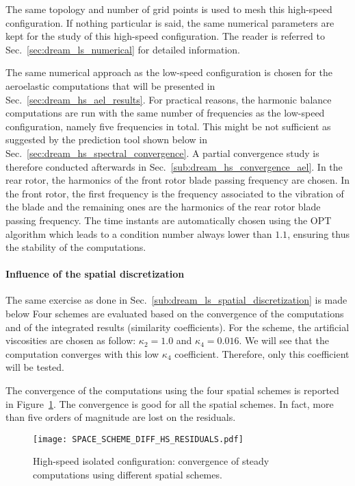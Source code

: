 
The same topology and number of grid points is used to
mesh this high-speed configuration. 
If nothing particular is said, the same numerical parameters
are kept for the study of this
high-speed configuration.
The reader is referred to 
Sec.~\ref{sec:dream_ls_numerical} for detailed information.

The same numerical approach as the low-speed configuration
is chosen for the aeroelastic computations that will
be presented in
Sec.~\ref{sec:dream_hs_ael_results}.
For practical reasons, the harmonic balance computations are run with
the same number of frequencies as the low-speed configuration,
namely five frequencies in total. This might be not sufficient
as suggested by the prediction tool shown below in 
Sec.~\ref{sec:dream_hs_spectral_convergence}. A partial 
convergence study is therefore conducted afterwards 
in Sec.~\ref{sub:dream_hs_convergence_ael}.
In the rear rotor,
the harmonics of the front rotor blade passing frequency
are chosen. In the front rotor, the first frequency is the
frequency associated to the vibration of the blade and the
remaining ones are the harmonics of the rear rotor blade 
passing frequency. 
The time instants are automatically chosen using the OPT
algorithm which leads to 
a condition number always lower than $1.1$, ensuring thus
the stability of the computations.

\paragraph{Influence of the spatial discretization}
\label{sub:dream_hs_spatial_discretization}

The same exercise as done in 
Sec.~\ref{sub:dream_ls_spatial_discretization} is made below
Four schemes are evaluated based 
on the convergence of the computations
and of the integrated 
results (similarity coefficients).
For the \citet{Jameson1981} scheme, the artificial viscosities
are chosen as follow: $\kappa_2 = 1.0$
and $\kappa_4 = 0.016$. We will see that the computation converges
with this low $\kappa_4$ coefficient. Therefore, only this coefficient
will be tested.

The convergence of the computations using the four spatial schemes
is reported in Figure~\ref{fig:DREAM_HS_RESIDUALS_PPT}. The convergence is good
for all the spatial schemes. In fact, more than five orders of magnitude
are lost on the residuals.
\begin{figure}[htp]
  \centering
  \texttt{[image: SPACE\_SCHEME\_DIFF\_HS\_RESIDUALS.pdf]}
  \caption{High-speed isolated configuration: convergence 
  of steady computations using different spatial schemes.}
  \label{fig:DREAM_HS_RESIDUALS_PPT}
\end{figure}

